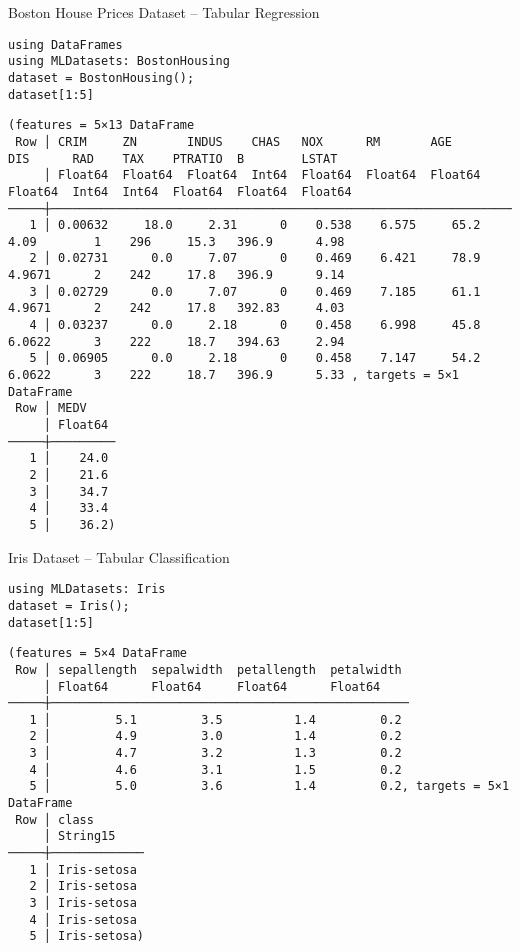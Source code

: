 \documentclass[10pt]{beamer}
\begin{document}
\begin{frame}[label={sec:org29d0780},fragile]{Boston House Prices Dataset -- Tabular Regression}
 \begin{verbatim}
using DataFrames
using MLDatasets: BostonHousing
dataset = BostonHousing();
dataset[1:5]
\end{verbatim}

\begin{verbatim}
(features = 5×13 DataFrame
 Row │ CRIM     ZN       INDUS    CHAS   NOX      RM       AGE      DIS      RAD    TAX    PTRATIO  B        LSTAT   
     │ Float64  Float64  Float64  Int64  Float64  Float64  Float64  Float64  Int64  Int64  Float64  Float64  Float64 
─────┼────────────────────────────────────────────────────────────────────────────────────────────────────────────────
   1 │ 0.00632     18.0     2.31      0    0.538    6.575     65.2   4.09        1    296     15.3   396.9      4.98 
   2 │ 0.02731      0.0     7.07      0    0.469    6.421     78.9   4.9671      2    242     17.8   396.9      9.14
   3 │ 0.02729      0.0     7.07      0    0.469    7.185     61.1   4.9671      2    242     17.8   392.83     4.03
   4 │ 0.03237      0.0     2.18      0    0.458    6.998     45.8   6.0622      3    222     18.7   394.63     2.94
   5 │ 0.06905      0.0     2.18      0    0.458    7.147     54.2   6.0622      3    222     18.7   396.9      5.33 , targets = 5×1 DataFrame
 Row │ MEDV
     │ Float64
─────┼─────────
   1 │    24.0
   2 │    21.6
   3 │    34.7
   4 │    33.4
   5 │    36.2)
\end{verbatim}
\end{frame}

\begin{frame}[label={sec:org6e162ca},fragile]{Iris Dataset -- Tabular Classification}
 \begin{verbatim}
using MLDatasets: Iris
dataset = Iris();
dataset[1:5]
\end{verbatim}

\begin{verbatim}
(features = 5×4 DataFrame
 Row │ sepallength  sepalwidth  petallength  petalwidth
     │ Float64      Float64     Float64      Float64
─────┼──────────────────────────────────────────────────
   1 │         5.1         3.5          1.4         0.2
   2 │         4.9         3.0          1.4         0.2
   3 │         4.7         3.2          1.3         0.2
   4 │         4.6         3.1          1.5         0.2
   5 │         5.0         3.6          1.4         0.2, targets = 5×1 DataFrame
 Row │ class
     │ String15
─────┼─────────────
   1 │ Iris-setosa
   2 │ Iris-setosa
   3 │ Iris-setosa
   4 │ Iris-setosa
   5 │ Iris-setosa)
\end{verbatim}
\end{frame}
\end{document}
